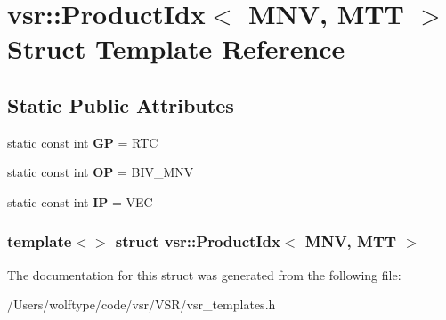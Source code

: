 \hypertarget{structvsr_1_1_product_idx_3_01_m_n_v_00_01_m_t_t_01_4}{\section{vsr\-:\-:Product\-Idx$<$ M\-N\-V, M\-T\-T $>$ Struct Template Reference}
\label{structvsr_1_1_product_idx_3_01_m_n_v_00_01_m_t_t_01_4}
}
\subsection*{Static Public Attributes}
\begin{DoxyCompactItemize}
\item 
\hypertarget{structvsr_1_1_product_idx_3_01_m_n_v_00_01_m_t_t_01_4_adb4fe941243be808469494012932fa4b}{static const int {\bfseries G\-P} = R\-T\-C}\label{structvsr_1_1_product_idx_3_01_m_n_v_00_01_m_t_t_01_4_adb4fe941243be808469494012932fa4b}

\item 
\hypertarget{structvsr_1_1_product_idx_3_01_m_n_v_00_01_m_t_t_01_4_ac79f4f8539604606716b12842e9f88e1}{static const int {\bfseries O\-P} = B\-I\-V\-\_\-\-M\-N\-V}\label{structvsr_1_1_product_idx_3_01_m_n_v_00_01_m_t_t_01_4_ac79f4f8539604606716b12842e9f88e1}

\item 
\hypertarget{structvsr_1_1_product_idx_3_01_m_n_v_00_01_m_t_t_01_4_a9ad30d9b0847caf580ef6b01b3b0a776}{static const int {\bfseries I\-P} = V\-E\-C}\label{structvsr_1_1_product_idx_3_01_m_n_v_00_01_m_t_t_01_4_a9ad30d9b0847caf580ef6b01b3b0a776}

\end{DoxyCompactItemize}
\subsubsection*{template$<$$>$ struct vsr\-::\-Product\-Idx$<$ M\-N\-V, M\-T\-T $>$}



The documentation for this struct was generated from the following file\-:\begin{DoxyCompactItemize}
\item 
/\-Users/wolftype/code/vsr/\-V\-S\-R/vsr\-\_\-templates.\-h\end{DoxyCompactItemize}
